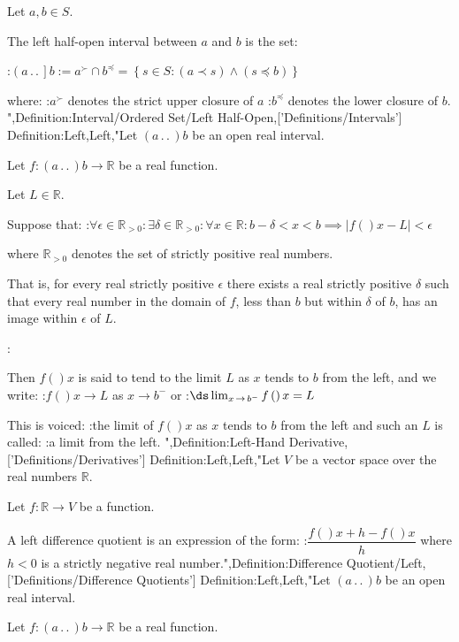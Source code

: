 Let $a, b \in S$.


The left half-open interval between $a$ and $b$ is the set:

:$\left( a \,.\,.\,   \right]b := a^\succ \cap b^\preccurlyeq = \left\lbrace s \in S: \left( a \prec s \right) \land \left( s \preccurlyeq b \right)  \right\rbrace$

where:
:$a^\succ$ denotes the strict upper closure of $a$
:$b^\preccurlyeq$ denotes the lower closure of $b$.
",Definition:Interval/Ordered Set/Left Half-Open,['Definitions/Intervals']
Definition:Left,Left,"Let $\left( a \,.\,.\,   \right)b$ be an open real interval.

Let $f: \left( a \,.\,.\,   \right)b \to \mathbb R$ be a real function.

Let $L \in \mathbb R$.


Suppose that:
:$\forall \epsilon \in \mathbb R_{>0}: \exists \delta \in \mathbb R_{>0}: \forall x \in \mathbb R: b - \delta < x < b \implies \left\lvert f \left(   \right)x - L \right\rvert < \epsilon$

where $\mathbb R_{>0}$ denotes the set of strictly positive real numbers.

That is, for every real strictly positive $\epsilon$ there exists a real strictly positive $\delta$ such that every real number in the domain of $f$, less than $b$ but within $\delta$ of $b$, has an image within $\epsilon$ of $L$.


:

Then $f \left(   \right)x$ is said to tend to the limit $L$ as $x$ tends to $b$ from the left, and we write:
:$f \left(   \right)x \to L$ as $x \to b^-$
or
:$\ds \lim_{x \mathop \to b^-} f \left(   \right)x = L$


This is voiced:
:the limit of $f \left(   \right)x$ as $x$ tends to $b$ from the left
and such an $L$ is called:
:a limit from the left.
",Definition:Left-Hand Derivative,['Definitions/Derivatives']
Definition:Left,Left,"Let $V$ be a vector space over the real numbers $\mathbb R$.

Let $f: \mathbb R \to V$ be a function.


A left difference quotient is an expression of the form:
:$\dfrac {f \left(   \right){x + h} - f \left(   \right)x} h$
where $h < 0$ is a strictly negative real number.",Definition:Difference Quotient/Left,['Definitions/Difference Quotients']
Definition:Left,Left,"Let $\left( a \,.\,.\,   \right)b$ be an open real interval.

Let $f: \left( a \,.\,.\,   \right)b \to \mathbb R$ be a real function.

